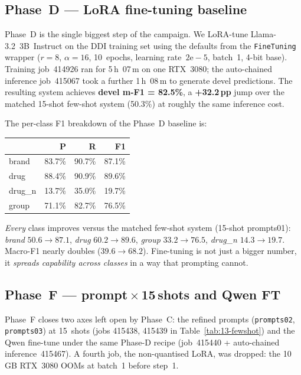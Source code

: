 \documentclass[a4paper,12pt]{article}
\begin{document}
\subsection{Phase~D --- LoRA fine-tuning baseline}
\label{sec:13-phaseD}

Phase~D is the single biggest step of the campaign. We LoRA-tune
Llama-3.2~3B~Instruct on the DDI training set using the defaults from
the \texttt{FineTuning} wrapper ($r=8$, $\alpha=16$, 10~epochs, learning
rate~$2\mathrm{e}{-}5$, batch~1, 4-bit base). Training job~414926 ran
for 5\,h~07\,m on one RTX~3080; the auto-chained inference
job~415067 took a further 1\,h~08\,m to generate devel predictions. The
resulting system achieves \textbf{devel m-F1 = 82.5\%}, a
\textbf{+32.2\,pp} jump over the matched 15-shot few-shot system (50.3\%) at
roughly the same inference cost.

The per-class F1 breakdown of the Phase~D baseline is:
\begin{center}
\begin{tabular}{l r r r}
\hline
 & P & R & F1 \\
\hline
brand   & 83.7\% & 90.7\% & \cellcolor{green!15}87.1\% \\
drug    & 88.4\% & 90.9\% & 89.6\% \\
drug\_n & 13.7\% & 35.0\% & \cellcolor{red!15}19.7\% \\
group   & 71.1\% & 82.7\% & 76.5\% \\
\hline
\end{tabular}
\end{center}
\textit{Every} class improves versus the matched few-shot system
(15-shot prompts01): \textit{brand} $50.6\to87.1$, \textit{drug}
$60.2\to89.6$, \textit{group} $33.2\to76.5$, \textit{drug\_n}
$14.3\to19.7$. Macro-F1 nearly doubles ($39.6\to68.2$).
Fine-tuning is not just a bigger number, it
\emph{spreads capability across classes} in a way that prompting cannot.

\subsection{Phase~F --- prompt\,$\times$\,15\,shots and Qwen FT}
\label{sec:13-phaseF}

Phase~F closes two axes left open by Phase~C: the refined prompts
(\texttt{prompts02}, \texttt{prompts03}) at 15~shots (jobs 415438,
415439 in Table~\ref{tab:13-fewshot}) and the Qwen fine-tune under the
same Phase-D recipe (job~415440 + auto-chained inference~415467). A
fourth job, the non-quantised LoRA, was dropped: the 10\,GB RTX~3080
OOMs at batch~1 before step~1.
\end{document}

